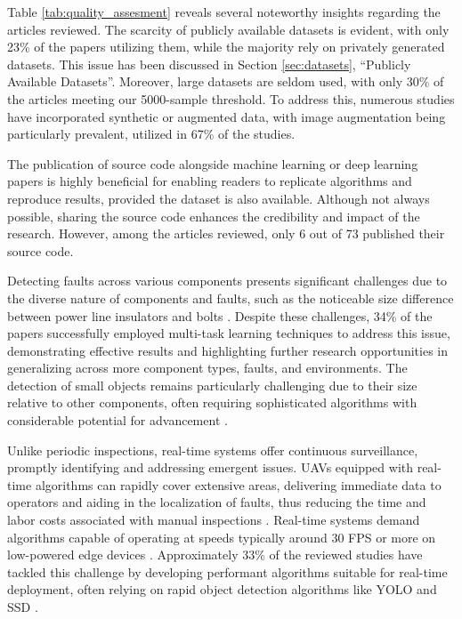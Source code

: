 Table \ref{tab:quality_assesment} reveals several noteworthy insights regarding the articles reviewed. The scarcity of publicly available datasets is evident, with only 23\% of the papers utilizing them, while the majority rely on privately generated datasets. This issue has been discussed in Section \ref{sec:datasets}, “Publicly Available Datasets”. Moreover, large datasets are seldom used, with only 30\% of the articles meeting our 5000-sample threshold. To address this, numerous studies have incorporated synthetic or augmented data, with image augmentation being particularly prevalent, utilized in 67\% of the studies.

The publication of source code alongside machine learning or deep learning papers is highly beneficial for enabling readers to replicate algorithms and reproduce results, provided the dataset is also available. Although not always possible, sharing the source code enhances the credibility and impact of the research. However, among the articles reviewed, only 6 out of 73 published their source code.

Detecting faults across various components presents significant challenges due to the diverse nature of components and faults, such as the noticeable size difference between power line insulators and bolts \cite{nguyen_intelligent_2019, liang_detection_2020}. Despite these challenges, 34\% of the papers successfully employed multi-task learning techniques to address this issue, demonstrating effective results and highlighting further research opportunities in generalizing across more component types, faults, and environments. The detection of small objects remains particularly challenging due to their size relative to other components, often requiring sophisticated algorithms with considerable potential for advancement \cite{odo_aerial_2021}.

Unlike periodic inspections, real-time systems offer continuous surveillance, promptly identifying and addressing emergent issues. UAVs equipped with real-time algorithms can rapidly cover extensive areas, delivering immediate data to operators and aiding in the localization of faults, thus reducing the time and labor costs associated with manual inspections \cite{zhang_cloud_edge_2020}. Real-time systems demand algorithms capable of operating at speeds typically around 30 FPS or more on low-powered edge devices \cite{miao_insulator_2019}. Approximately 33\% of the reviewed studies have tackled this challenge by developing performant algorithms suitable for real-time deployment, often relying on rapid object detection algorithms like YOLO \cite{sadykova2019yolo} and SSD \cite{miao_insulator_2019}.

